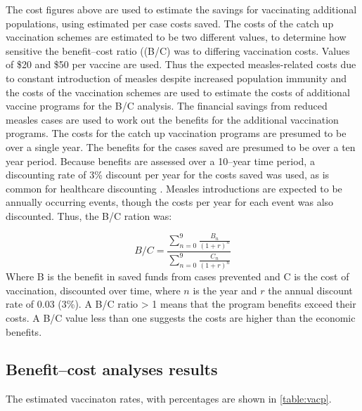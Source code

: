 \documentclass{article}
\begin{document}
The cost figures above are used to estimate the savings for vaccinating additional populations, using estimated per case costs saved. The costs of the catch up vaccination schemes are estimated to be two different values, to determine how sensitive the benefit--cost ratio ((B/C) was to differing vaccination costs. Values of \$20 and \$50 per vaccine are used. Thus the expected measles-related costs due to constant introduction of measles despite increased population immunity and the costs of the vaccination schemes are used to estimate the costs of additional vaccine programs for the B/C analysis. The financial savings from reduced measles cases are used to work out the benefits for the additional vaccination programs. The costs for the catch up vaccination programs are presumed to be over a single year. The benefits for the cases saved are presumed to be over a ten year period. Because benefits are assessed over a 10--year time period, a discounting rate of 3\% discount per year for the costs saved was used, as is common for healthcare discounting \citep{honeycutt6}. Measles introductions are expected to be annually occurring events, though the costs per year for each event was also discounted. Thus, the B/C ration was:

\begin{equation} \label{eq:bc}
 \textit{B/C} = \frac{\sum\limits_{n=0}^{9} \frac{B_n}{(1+r)^n}}{\sum\limits_{n=0}^{9} \frac{C_n}{(1+r)^n}}
 \end{equation}
Where B is the benefit in saved funds from cases prevented and C is the cost of vaccination, discounted over time, where $n$ is the year and $r$ the annual discount rate of 0.03 (3\%).
A B/C ratio > 1 means that the program benefits exceed their costs. A B/C value less than one suggests the costs are higher than the economic benefits.

\subsection{Benefit--cost analyses results}

The estimated vaccinaton rates, with percentages are shown in \autoref{table:vacp}.
\end{document}
